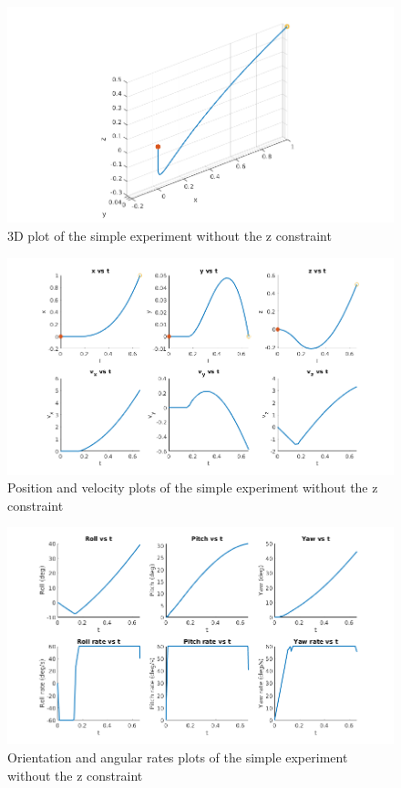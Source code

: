 \documentclass[letterpaper, 10 pt, conference]{ieeeconf}  %
\begin{document}
\begin{figure}[!htpb]
	\centering
	\includegraphics[width=1.0\linewidth]{Images/simple_zfree/3d.png}
	\caption{3D plot of the simple experiment without the z constraint}
	\label{fig:simple_zfree_3d}
\end{figure}
\begin{figure}[!htpb]
	\centering
	\includegraphics[width=1.0\linewidth]{Images/simple_zfree/pos_vel.png}
	\caption{Position and velocity plots of the simple experiment without the z constraint}
	\label{fig:simple_zfree_pos_vel}
\end{figure}
\begin{figure}[!htpb]
	\centering
	\includegraphics[width=1.0\linewidth]{Images/simple_zfree/orient_rates.png}
	\caption{Orientation and angular rates plots of the simple experiment without the z constraint}
	\label{fig:simple_zfree_orient_rates}
\end{figure}
\end{document}
